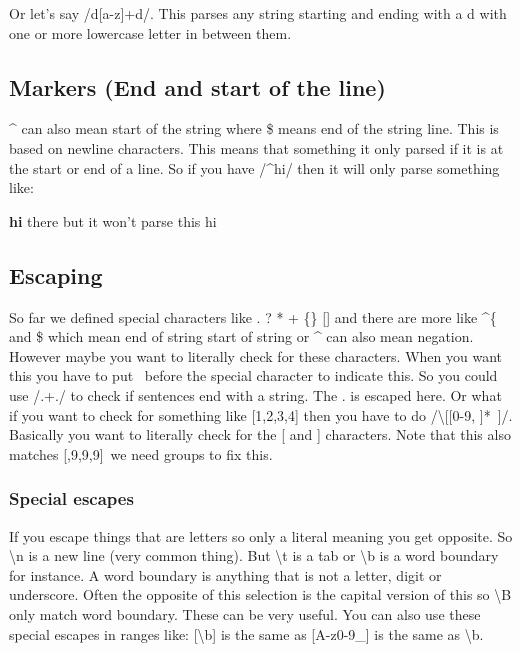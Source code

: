 \documentclass[
  11pt,
  british,
]{article}
\begin{document}
Or let's say /d{[}a-z{]}+d/. This parses any string starting and ending
with a d with one or more lowercase letter in between them.

\hypertarget{markers-end-and-start-of-the-line}{%
\subsection{Markers (End and start of the
line)}\label{markers-end-and-start-of-the-line}}

\^{} can also mean start of the string where \$ means end of the string
line. This is based on newline characters. This means that something it
only parsed if it is at the start or end of a line. So if you have
/\^{}hi/ then it will only parse something like:

\textbf{hi} there but it won't parse this hi

\hypertarget{escaping}{%
\subsection{Escaping}\label{escaping}}

So far we defined special characters like . ? * + \{\} {[}{]} and there
are more like \^{}\{ and \$ which mean end of string start of string or
\^{} can also mean negation. However maybe you want to literally check
for these characters. When you want this you have to put ~before the
special character to indicate this. So you could use /.+./ to check if
sentences end with a string. The . is escaped here. Or what if you want
to check for something like {[}1,2,3,4{]} then you have to do
/\textbackslash{[}{[}0-9, {]}*~{]}/. Basically you want to literally
check for the {[} and {]} characters. Note that this also matches
{[},9,9,9{]}~we need groups to fix this.

\hypertarget{special-escapes}{%
\subsubsection{Special escapes}\label{special-escapes}}

If you escape things that are letters so only a literal meaning you get
opposite. So \textbackslash n is a new line (very common thing). But
\textbackslash t is a tab or \textbackslash b is a word boundary for
instance. A word boundary is anything that is not a letter, digit or
underscore. Often the opposite of this selection is the capital version
of this so \textbackslash B only match word boundary. These can be very
useful. You can also use these special escapes in ranges like:
{[}\textbackslash b{]} is the same as {[}A-z0-9\_{]} is the same as
\textbackslash b.
\end{document}

